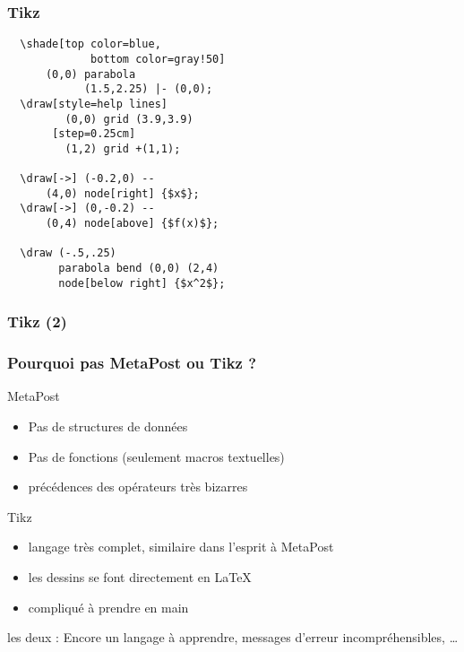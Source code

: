\documentclass[nodefaultblocks]{beamer}
\begin{document}
\begin{frame}[fragile]\frametitle{Tikz}
  \begin{minipage}[]{0.45\textwidth}
  \footnotesize
  \begin{verbatim}
  \shade[top color=blue,
             bottom color=gray!50] 
      (0,0) parabola 
            (1.5,2.25) |- (0,0);
  \draw[style=help lines] 
         (0,0) grid (3.9,3.9)
       [step=0.25cm]      
         (1,2) grid +(1,1);

  \draw[->] (-0.2,0) -- 
      (4,0) node[right] {$x$};
  \draw[->] (0,-0.2) -- 
      (0,4) node[above] {$f(x)$};

  \draw (-.5,.25) 
        parabola bend (0,0) (2,4) 
        node[below right] {$x^2$};
  \end{verbatim}
  \end{minipage}
  \begin{minipage}[]{0.4\textwidth}
  \end{minipage}
\end{frame}

\begin{frame}[fragile]\frametitle{Tikz (2)}
\end{frame}
\begin{frame}\frametitle{Pourquoi pas MetaPost ou Tikz ?}
  \begin{block}{MetaPost}
    \begin{itemize}
      \item Pas de structures de données
      \item Pas de fonctions (seulement macros textuelles) 
      \item précédences des opérateurs très bizarres
    \end{itemize}
  \end{block}
  \begin{block}{Tikz}
    \begin{itemize}
      \item langage très complet, similaire dans l'esprit à MetaPost
      \item les dessins se font directement en \LaTeX
      \item compliqué à prendre en main 
    \end{itemize}
  \end{block}

  \medskip

  les deux : Encore un langage à apprendre, messages d'erreur
  incompréhensibles, \dots
\end{frame}
\end{document}
